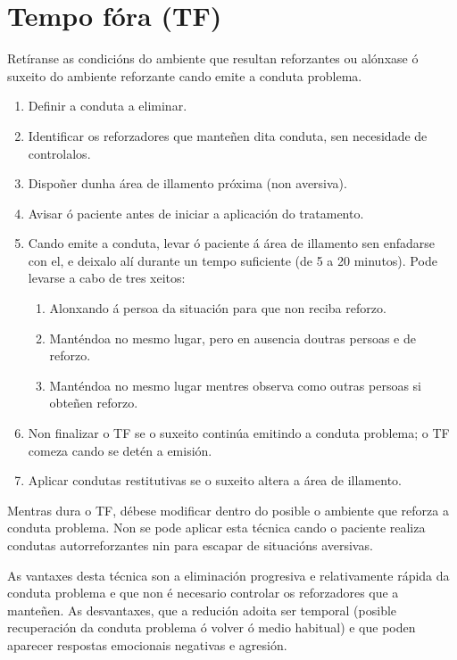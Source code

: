 \documentclass[a4paper,11pt]{article}
\begin{document}
\section{Tempo fóra (TF)}
Retíranse as condicións do ambiente que resultan reforzantes ou alónxase ó suxeito do ambiente reforzante cando emite a conduta problema.
\begin{enumerate}
	\item Definir a conduta a eliminar.
	\item Identificar os reforzadores que manteñen dita conduta, sen necesidade de controlalos.
	\item Dispoñer dunha área de illamento próxima (non aversiva).
	\item Avisar ó paciente antes de iniciar a aplicación do tratamento.
	\item Cando emite a conduta, levar ó paciente á área de illamento sen enfadarse con el, e deixalo 
	alí durante un tempo suficiente (de 5 a 20 minutos). Pode levarse a cabo de tres xeitos:
	\begin{enumerate}
		\item Alonxando á persoa da situación para que non reciba reforzo.
		\item Manténdoa no mesmo lugar, pero en ausencia doutras persoas e de reforzo.
		\item Manténdoa no mesmo lugar mentres observa como outras persoas si obteñen reforzo. 
	\end{enumerate}
	\item Non finalizar o TF se o suxeito continúa emitindo a conduta problema; o TF comeza cando se 
	detén a emisión.
	\item Aplicar condutas restitutivas se o suxeito altera a área de illamento. 
\end{enumerate}

Mentras dura o TF, débese modificar dentro do posible o ambiente que reforza a conduta problema. Non se pode aplicar esta técnica cando o paciente realiza condutas autorreforzantes nin para escapar de situacións aversivas. 

As vantaxes desta técnica son a eliminación progresiva e relativamente rápida da conduta problema e que non é necesario controlar os reforzadores que a manteñen. As desvantaxes, que a redución adoita ser temporal (posible recuperación da conduta problema ó volver ó medio habitual) e que poden aparecer respostas emocionais negativas e agresión. 
\end{document}
